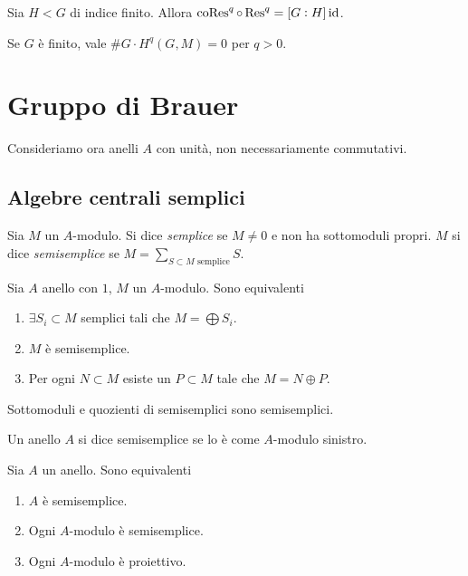 \begin{proposition}
    Sia $H<G$ di indice finito. Allora $\operatorname{coRes}^q\circ\operatorname{Res}^q=[G:H]\operatorname{id}$.
\end{proposition}
\begin{corollary}
    Se $G$ è finito, vale $\#G\cdot H^q(G,M)=0$ per $q>0$.
\end{corollary}


\section{Gruppo di Brauer}
Consideriamo ora anelli $A$ con unità, non necessariamente commutativi.

\subsection{Algebre centrali semplici}

\begin{definition}
    Sia $M$ un $A$-modulo. Si dice \emph{semplice} se $M\neq0$ e non ha sottomoduli propri. $M$ si dice \emph{semisemplice} se $M=\sum_{S\subset M \text{ semplice}} S$.
\end{definition}


\begin{theorem}
    Sia $A$ anello con $1$, $M$ un $A$-modulo. Sono equivalenti
    \begin{enumerate}
        \item $\exists S_i\subset M$ semplici tali che $M=\bigoplus S_i$.
        \item $M$ è semisemplice.
        \item Per ogni $N\subset M$ esiste un $P\subset M$ tale che $M=N\oplus P$.
    \end{enumerate}
\end{theorem}

\begin{oss}
    Sottomoduli e quozienti di semisemplici sono semisemplici.
\end{oss}

\begin{definition}
    Un anello $A$ si dice semisemplice se lo è come $A$-modulo sinistro.
\end{definition}

\begin{proposition}
    Sia $A$ un anello. Sono equivalenti
    \begin{enumerate}
        \item $A$ è semisemplice.
        \item Ogni $A$-modulo è semisemplice.
        \item Ogni $A$-modulo è proiettivo.
    \end{enumerate}
\end{proposition}

